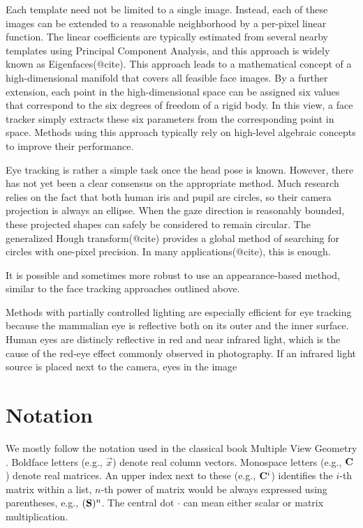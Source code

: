 Each template need not be limited to a single image.
Instead, each of these images can be extended to a reasonable neighborhood by a per-pixel linear function.
The linear coefficients are typically estimated from several nearby templates using Principal Component Analysis, and this approach is widely known as Eigenfaces(@cite).
This approach leads to a mathematical concept of a high-dimensional manifold that covers all feasible face images.
By a further extension, each point in the high-dimensional space can be assigned six values that correspond to the six degrees of freedom of a rigid body.
In this view, a face tracker simply extracts these six parameters from the corresponding point in space.
Methods using this approach typically rely on high-level algebraic concepts to improve their performance.

Eye tracking is rather a simple task once the head pose is known.
However, there has not yet been a clear consensus on the appropriate method.
Much research relies on the fact that both human iris and pupil are circles, so their camera projection is always an ellipse.
When the gaze direction is reasonably bounded, these projected shapes can safely be considered to remain circular.
The generalized Hough transform(@cite) provides a global method of searching for circles with one-pixel precision.
In many applications(@cite), this is enough.

It is possible and sometimes more robust to use an appearance-based method, similar to the face tracking approaches outlined above.
\todo{\dots}

\todo{\dots}
Methods with partially controlled lighting are especially efficient for eye tracking because the mammalian eye is reflective both on its outer and the inner surface.
Human eyes are distincly reflective in red and near infrared light, which is the cause of the red-eye effect commonly observed in photography.
If an infrared light source is placed next to the camera, eyes in the image



\section{Notation}

We mostly follow the notation used in the classical book Multiple View Geometry \cite{b:hartley04}.
Boldface letters (e.g., $\vec x$) denote real column vectors.
Monospace letters (e.g., $\mathbf{C}$) denote real matrices.
An upper index next to these (e.g., $\mathbf{C}^i$) identifies the $i$-th matrix within a list, $n$-th power of matrix would be always expressed using parentheses, e.g., $(\mathbf{S})^n$.
The central dot $\cdot$ can mean either scalar or matrix multiplication.

